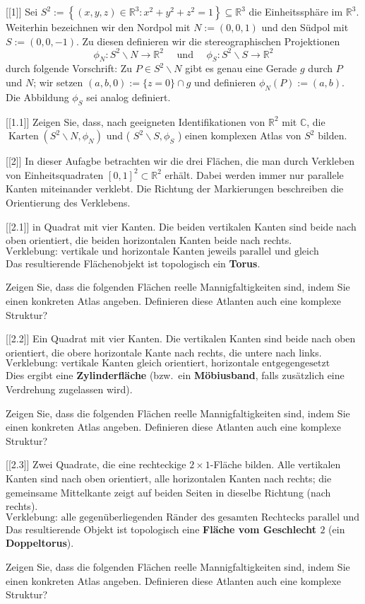 
[[1]]
Sei $S^2:=\left\{(x, y, z) \in \mathbb{R}^3: x^2+y^2+z^2=1\right\} \subseteq \mathbb{R}^3$ die Einheitssphäre im $\mathbb{R}^3$. Weiterhin bezeichnen wir den Nordpol mit $N:=(0,0,1)$ und den Südpol mit $S:=(0,0,-1)$. Zu diesen definieren wir die stereographischen Projektionen
$$
\phi_N: S^2 \backslash N \rightarrow \mathbb{R}^2 \quad \text { und } \quad \phi_S: S^2 \backslash S \rightarrow \mathbb{R}^2
$$
durch folgende Vorschrift: Zu $P \in S^2 \backslash N$ gibt es genau eine Gerade $g$ durch $P$ und $N$; wir setzen $(a, b, 0):=\{z=0\} \cap g$ und definieren $\phi_N(P):=(a, b)$. Die Abbildung $\phi_S$ sei analog definiert.

[[1.1]]
Zeigen Sie, dass, nach geeigneten Identifikationen von $\mathbb{R}^2$ mit $\mathbb{C}$, die $\operatorname{Karten}\left(S^2 \backslash N, \phi_N\right)$ und ( $S^2 \backslash S, \phi_S$ ) einen komplexen Atlas von $S^2$ bilden.


[[2]]
In dieser Aufagbe betrachten wir die drei Flächen, die man durch Verkleben von Einheitsquadraten $[0,1]^2 \subset \mathbb{R}^2$ erhält. Dabei werden immer nur parallele Kanten miteinander verklebt. Die Richtung der Markierungen beschreiben die Orientierung des Verklebens.


[[2.1]]
in Quadrat mit vier Kanten. 
Die beiden vertikalen Kanten sind beide nach oben orientiert, 
die beiden horizontalen Kanten beide nach rechts.  
\[
\text{Verklebung: vertikale und horizontale Kanten jeweils parallel und gleich orientiert.}
\]
Das resultierende Flächenobjekt ist topologisch ein \textbf{Torus}.

Zeigen Sie, dass die folgenden Flächen reelle Mannigfaltigkeiten sind, indem Sie einen konkreten Atlas angeben. Definieren diese Atlanten auch eine komplexe Struktur?

[[2.2]]
Ein Quadrat mit vier Kanten. 
Die vertikalen Kanten sind beide nach oben orientiert, 
die obere horizontale Kante nach rechts, 
die untere nach links.  
\[
\text{Verklebung: vertikale Kanten gleich orientiert, horizontale entgegengesetzt orientiert.}
\]
Dies ergibt eine \textbf{Zylinderfläche} 
(bzw.\ ein \textbf{Möbiusband}, falls zusätzlich eine Verdrehung zugelassen wird).

Zeigen Sie, dass die folgenden Flächen reelle Mannigfaltigkeiten sind, indem Sie einen konkreten Atlas angeben. Definieren diese Atlanten auch eine komplexe Struktur?

[[2.3]]
Zwei Quadrate, die eine rechteckige $2\times1$-Fläche bilden.  
Alle vertikalen Kanten sind nach oben orientiert, 
alle horizontalen Kanten nach rechts; 
die gemeinsame Mittelkante zeigt auf beiden Seiten in dieselbe Richtung (nach rechts).  
\[
\text{Verklebung: alle gegenüberliegenden Ränder des gesamten Rechtecks parallel und gleich orientiert.}
\]
Das resultierende Objekt ist topologisch eine \textbf{Fläche vom Geschlecht $2$} (ein \textbf{Doppeltorus}).

Zeigen Sie, dass die folgenden Flächen reelle Mannigfaltigkeiten sind, indem Sie einen konkreten Atlas angeben. Definieren diese Atlanten auch eine komplexe Struktur?
